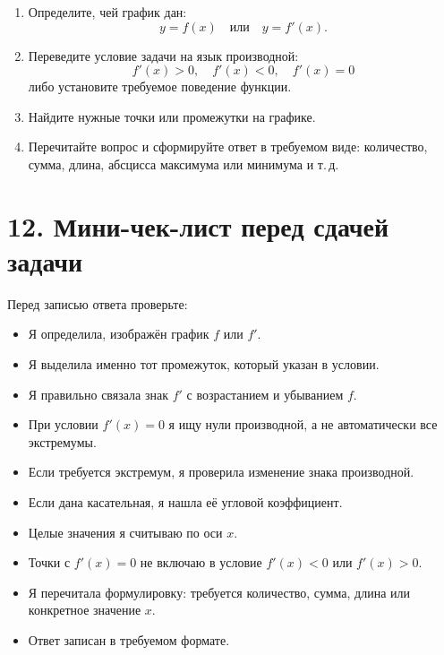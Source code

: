 \documentclass[a4paper,12pt]{article}
\begin{document}
\begin{enumerate}[leftmargin=8mm,label=\textbf{\arabic*.}]
  \item Определите, чей график дан:
  \[
  y=f(x)\quad\text{или}\quad y=f'(x).
  \]

  \item Переведите условие задачи на язык производной:
  \[
  f'(x)>0,\quad
  f'(x)<0,\quad
  f'(x)=0
  \]
  либо установите требуемое поведение функции.

  \item Найдите нужные точки или промежутки на графике.

  \item Перечитайте вопрос и сформируйте ответ в требуемом виде:
  количество, сумма, длина, абсцисса максимума или минимума и т.\,д.
\end{enumerate}


\section*{12. Мини-чек-лист перед сдачей задачи}

Перед записью ответа проверьте:

\begin{itemize}[leftmargin=7mm,label=\(\square\)]
  \item Я определила, изображён график \(f\) или \(f'\).
  \item Я выделила именно тот промежуток, который указан в условии.
  \item Я правильно связала знак \(f'\) с возрастанием и убыванием \(f\).
  \item При условии \(f'(x)=0\) я ищу нули производной, а не автоматически все экстремумы.
  \item Если требуется экстремум, я проверила изменение знака производной.
  \item Если дана касательная, я нашла её угловой коэффициент.
  \item Целые значения я считываю по оси \(x\).
  \item Точки с \(f'(x)=0\) не включаю в условие \(f'(x)<0\) или \(f'(x)>0\).
  \item Я перечитала формулировку: требуется количество, сумма, длина или конкретное значение \(x\).
  \item Ответ записан в требуемом формате.
\end{itemize}

\end{document}
